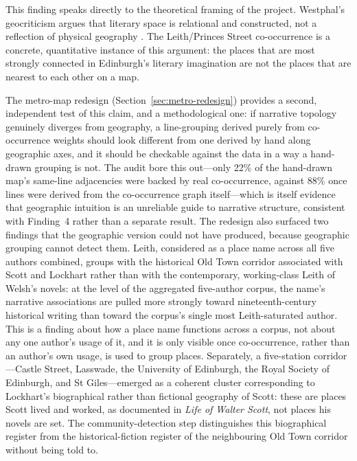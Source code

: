 \documentclass[logo,msc]{infthesis}
\begin{document}
This finding speaks directly to the theoretical framing of the project. Westphal's geocriticism argues that literary space is relational and constructed, not a reflection of physical geography \cite{westphal2011}. The Leith/Princes Street co-occurrence is a concrete, quantitative instance of this argument: the places that are most strongly connected in Edinburgh's literary imagination are not the places that are nearest to each other on a map.

The metro-map redesign (Section~\ref{sec:metro-redesign}) provides a second, independent test of this claim, and a methodological one: if narrative topology genuinely diverges from geography, a line-grouping derived purely from co-occurrence weights should look different from one derived by hand along geographic axes, and it should be checkable against the data in a way a hand-drawn grouping is not. The audit bore this out---only 22\% of the hand-drawn map's same-line adjacencies were backed by real co-occurrence, against 88\% once lines were derived from the co-occurrence graph itself---which is itself evidence that geographic intuition is an unreliable guide to narrative structure, consistent with Finding~4 rather than a separate result. The redesign also surfaced two findings that the geographic version could not have produced, because geographic grouping cannot detect them. Leith, considered as a place name across all five authors combined, groups with the historical Old Town corridor associated with Scott and Lockhart rather than with the contemporary, working-class Leith of Welsh's novels: at the level of the aggregated five-author corpus, the name's narrative associations are pulled more strongly toward nineteenth-century historical writing than toward the corpus's single most Leith-saturated author. This is a finding about how a place name functions across a corpus, not about any one author's usage of it, and it is only visible once co-occurrence, rather than an author's own usage, is used to group places. Separately, a five-station corridor---Castle Street, Lasswade, the University of Edinburgh, the Royal Society of Edinburgh, and St Giles---emerged as a coherent cluster corresponding to Lockhart's biographical rather than fictional geography of Scott: these are places Scott lived and worked, as documented in \textit{Life of Walter Scott}, not places his novels are set. The community-detection step distinguishes this biographical register from the historical-fiction register of the neighbouring Old Town corridor without being told to.
\end{document}
